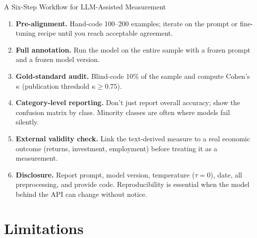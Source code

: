 \documentclass[10pt,english,aspectratio=169]{beamer}
\begin{document}
\begin{frame}{A Six-Step Workflow for LLM-Assisted Measurement}
\begin{enumerate}
\item \textbf{Pre-alignment.} Hand-code 100--200 examples; iterate on the prompt or fine-tuning recipe until you reach acceptable agreement.
\medskip
\item \textbf{Full annotation.} Run the model on the entire sample with a frozen prompt and a frozen model version.
\medskip
\item \textbf{Gold-standard audit.} Blind-code 10\% of the sample and compute Cohen's $\kappa$ (publication threshold $\kappa \ge 0.75$).
\medskip
\item \textbf{Category-level reporting.} Don't just report overall accuracy; show the confusion matrix by class. Minority classes are often where models fail silently.
\medskip
\item \textbf{External validity check.} Link the text-derived measure to a real economic outcome (returns, investment, employment) before treating it as a measurement.
\medskip
\item \textbf{Disclosure.} Report prompt, model version, temperature ($\tau = 0$), date, all preprocessing, and provide code. Reproducibility is essential when the model behind the API can change without notice.
\end{enumerate}
\end{frame}

\section{Limitations}
\end{document}
